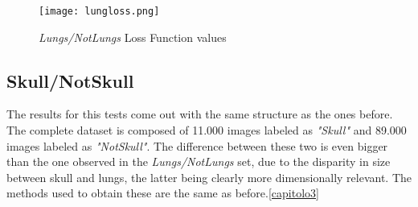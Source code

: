 \documentclass[../main.tex]{subfiles}
\begin{document}
\begin{figure}[h!b]
	\centering
	\texttt{[image: lungloss.png]}
	\caption{\textit{Lungs/NotLungs} Loss Function values}
	\label{fig:lungloss}
\end{figure}

\subsection{Skull/NotSkull}
The results for this tests come out with the same structure as the ones before. The complete dataset is composed of 11.000 images labeled as \textit{"Skull"} and 89.000 images labeled as \textit{"NotSkull"}. The difference between these two is even bigger than the one observed in the \textit{Lungs/NotLungs} set, due to the disparity in size between skull and lungs, the latter being clearly more dimensionally relevant. The methods used to obtain these are the same as before.\ref{capitolo3}

\begin{table}
\caption{\textit{Skull/Not Skull} Results}
\label{tab:SNSres}
\end{table}
\end{document}
